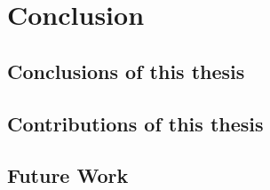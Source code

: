 
\chapter{Conclusion}

\section{Conclusions of this thesis}

\section{Contributions of this thesis}

\section{Future Work}